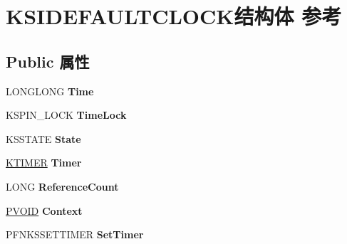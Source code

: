 \hypertarget{struct_k_s_i_d_e_f_a_u_l_t_c_l_o_c_k}{}\section{K\+S\+I\+D\+E\+F\+A\+U\+L\+T\+C\+L\+O\+C\+K结构体 参考}
\label{struct_k_s_i_d_e_f_a_u_l_t_c_l_o_c_k}
\subsection*{Public 属性}
\begin{DoxyCompactItemize}
\item 
\mbox{\label{struct_k_s_i_d_e_f_a_u_l_t_c_l_o_c_k_ab703f6c5c42a7b637bd8e7c75baa73ae}} 
L\+O\+N\+G\+L\+O\+NG {\bfseries Time}
\item 
\mbox{\label{struct_k_s_i_d_e_f_a_u_l_t_c_l_o_c_k_a58e15c18012691ffdab905ddd2169539}} 
K\+S\+P\+I\+N\+\_\+\+L\+O\+CK {\bfseries Time\+Lock}
\item 
\mbox{\label{struct_k_s_i_d_e_f_a_u_l_t_c_l_o_c_k_a35f385dff440a27bd8e81b2008a32364}} 
K\+S\+S\+T\+A\+TE {\bfseries State}
\item 
\mbox{\label{struct_k_s_i_d_e_f_a_u_l_t_c_l_o_c_k_a9776b3adf140495a24a70f8817d1947c}} 
\hyperlink{struct___k_t_i_m_e_r}{K\+T\+I\+M\+ER} {\bfseries Timer}
\item 
\mbox{\label{struct_k_s_i_d_e_f_a_u_l_t_c_l_o_c_k_a7b0254e9ae38d349b6e7e194506e9311}} 
L\+O\+NG {\bfseries Reference\+Count}
\item 
\mbox{\label{struct_k_s_i_d_e_f_a_u_l_t_c_l_o_c_k_ae7d7752c732fe11bf1e7f62eba287f59}} 
\hyperlink{interfacevoid}{P\+V\+O\+ID} {\bfseries Context}
\item 
\mbox{\label{struct_k_s_i_d_e_f_a_u_l_t_c_l_o_c_k_a9a22c7062f356729cbec994637aaee13}} 
P\+F\+N\+K\+S\+S\+E\+T\+T\+I\+M\+ER {\bfseries Set\+Timer}
\item 
\mbox{\label{struct_k_s_i_d_e_f_a_u_l_t_c_l_o_c_k_a677c13e4d0f1b5c9fdb2ab6ba3b44344}} 

\end{DoxyCompactItemize}

